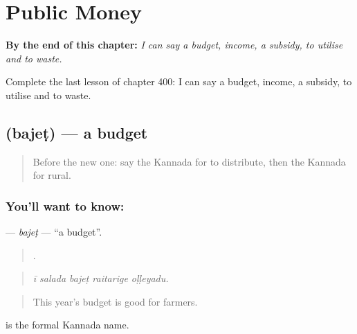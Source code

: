 
\chapter{Public Money}
\label{ch:ka-public-money}

\begin{chapteropening}
\textbf{By the end of this chapter:} \emph{I can say a budget, income, a subsidy, to utilise and to waste.}

Complete the last lesson of chapter 400: I can say a budget, income, a subsidy, to utilise and to waste.
\end{chapteropening}

\section[\texorpdfstring{\kn{ಬಜೆಟ್} (bajeṭ)}{ಬಜೆಟ್ (bajeṭ)}]{ (bajeṭ) — a budget}

\label{lesson:KA-C400-bajet}



\begin{quote}
Before the new one: say the Kannada for to distribute, then the Kannada for rural.
\end{quote}

\subsection*{You'll want to know: }
\textbf{} — \emph{bajeṭ} — \textquotedblleft{}a budget\textquotedblright{}.

\begin{quote}
    .
\end{quote}

\begin{quote}
\emph{ī salada bajeṭ raitarige oḷḷeyadu.}
\end{quote}

\begin{quote}
This year's budget is good for farmers.
\end{quote}

  is the formal Kannada name.

